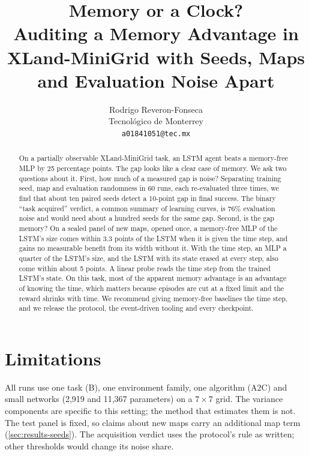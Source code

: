 \documentclass[11pt]{article}
\title{Memory or a Clock?\\
\large Auditing a Memory Advantage in XLand-MiniGrid with Seeds, Maps and Evaluation Noise Apart}
\author{Rodrigo Reveron-Fonseca\\
Tecnol\'ogico de Monterrey\\
\texttt{a01841051@tec.mx}}
\date{}
\begin{document}
\maketitle

\begin{abstract}
On a partially observable XLand-MiniGrid task, an LSTM agent beats a memory-free MLP by 25
percentage points. The gap looks like a clear case of memory. We ask two questions about it.
First, how much of a measured gap is noise? Separating training seed, map and evaluation
randomness in 60 runs, each re-evaluated three times, we find that about ten paired seeds detect
a 10-point gap in final success. The binary ``task acquired'' verdict, a common summary of
learning curves, is 76\% evaluation noise and would need about a hundred seeds for the same gap.
Second, is the gap memory? On a sealed panel of new maps, opened once, a memory-free MLP of the
LSTM's size comes within 3.3 points of the LSTM when it is given the time step, and gains no
measurable benefit from its width without it. With the time step, an MLP a quarter of the
LSTM's size, and the LSTM with its state erased at every step, also come within about 5 points.
A linear probe reads the time step from the trained LSTM's state. On this task, most of the
apparent memory advantage is an advantage of knowing the time, which matters because episodes
are cut at a fixed limit and the reward shrinks with time. We recommend giving memory-free baselines the time step,
and we release the protocol, the event-driven tooling and every checkpoint.
\end{abstract}









\section{Limitations}
\label{sec:limitations}
All runs use one task (B), one environment family, one algorithm (A2C) and small networks
(2,919 and 11,367 parameters) on a $7\times7$ grid. The variance components are specific to
this setting; the method that estimates them is not. The test panel is fixed, so claims about
new maps carry an additional map term (\cref{sec:results-seeds}). The acquisition verdict uses
the protocol's rule as written; other thresholds would change its noise share.
\end{document}
